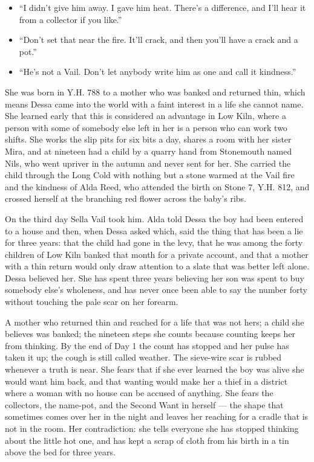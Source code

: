\documentclass{design/chronicle}
\begin{document}
{\begin{itemize}[leftmargin=1.4em,itemsep=1pt,topsep=3pt,parsep=0pt]
\item “I didn’t give him away. I gave him heat. There’s a difference, and I’ll hear it from a collector if you like.”

\item “Don’t set that near the fire. It’ll crack, and then you’ll have a crack and a pot.”

\item “He’s not a Vail. Don’t let anybody write him as one and call it kindness.”

\end{itemize}

She was born in Y.H. 788 to a mother who was banked and returned thin, which means Dessa came into the world with a faint interest in a life she cannot name. She learned early that this is considered an advantage in Low Kiln, where a person with some of somebody else left in her is a person who can work two shifts. She works the slip pits for six bits a day, shares a room with her sister Mira, and at nineteen had a child by a quarry hand from Stonemouth named Nils, who went upriver in the autumn and never sent for her. She carried the child through the Long Cold with nothing but a stone warmed at the Vail fire and the kindness of Alda Reed, who attended the birth on Stone 7, Y.H. 812, and crossed herself at the branching red flower across the baby’s ribs.

On the third day Sella Vail took him. Alda told Dessa the boy had been entered to a house and then, when Dessa asked which, said the thing that has been a lie for three years: that the child had gone in the levy, that he was among the forty children of Low Kiln banked that month for a private account, and that a mother with a thin return would only draw attention to a slate that was better left alone. Dessa believed her. She has spent three years believing her son was spent to buy somebody else’s wholeness, and has never once been able to say the number forty without touching the pale scar on her forearm.

A mother who returned thin and reached for a life that was not hers; a child she believes was banked; the nineteen steps she counts because counting keeps her from thinking. By the end of Day 1 the count has stopped and her pulse has taken it up; the cough is still called weather. The sieve-wire scar is rubbed whenever a truth is near. She fears that if she ever learned the boy was alive she would want him back, and that wanting would make her a thief in a district where a woman with no house can be accused of anything. She fears the collectors, the name-pot, and the Second Want in herself — the shape that sometimes comes over her in the night and leaves her reaching for a cradle that is not in the room. Her contradiction: she tells everyone she has stopped thinking about the little hot one, and has kept a scrap of cloth from his birth in a tin above the bed for three years.

}
\end{document}
